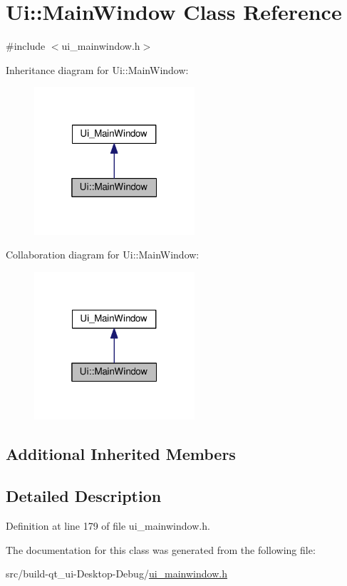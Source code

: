 \hypertarget{class_ui_1_1_main_window}{}\section{Ui\+:\+:Main\+Window Class Reference}
\label{class_ui_1_1_main_window}


{\ttfamily \#include $<$ui\+\_\+mainwindow.\+h$>$}



Inheritance diagram for Ui\+:\+:Main\+Window\+:\nopagebreak
\begin{figure}[H]
\begin{center}
\leavevmode
\includegraphics[width=169pt]{class_ui_1_1_main_window__inherit__graph}
\end{center}
\end{figure}


Collaboration diagram for Ui\+:\+:Main\+Window\+:\nopagebreak
\begin{figure}[H]
\begin{center}
\leavevmode
\includegraphics[width=169pt]{class_ui_1_1_main_window__coll__graph}
\end{center}
\end{figure}
\subsection*{Additional Inherited Members}


\subsection{Detailed Description}


Definition at line 179 of file ui\+\_\+mainwindow.\+h.



The documentation for this class was generated from the following file\+:\begin{DoxyCompactItemize}
\item 
src/build-\/qt\+\_\+ui-\/\+Desktop-\/\+Debug/\hyperlink{ui__mainwindow_8h}{ui\+\_\+mainwindow.\+h}\end{DoxyCompactItemize}
